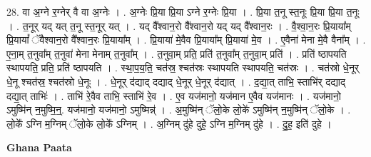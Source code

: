 \documentclass[17pt]{extarticle}
\begin{document}
28. वा अ॒ग्ने र॒ग्नेर् वै वा अ॒ग्नेः । . अ॒ग्नेः प्रि॒या प्रि॒या ऽग्ने र॒ग्नेः प्रि॒या । . प्रि॒या त॒नू स्त॒नूः प्रि॒या प्रि॒या त॒नूः । . त॒नूर् यद् यत् त॒नू स्त॒नूर् यत् । . यद् वै᳚श्वान॒रो वै᳚श्वान॒रो यद् यद् वै᳚श्वान॒रः । . वै॒श्वा॒न॒रः प्रि॒याया᳚म् प्रि॒यायां᳚ ॅवैश्वान॒रो वै᳚श्वान॒रः प्रि॒याया᳚म् । . प्रि॒याया॑ मे॒वैव प्रि॒याया᳚म् प्रि॒याया॑ मे॒व । . ए॒वैना॑ मेना मे॒वै वैना᳚म् । . ए॒ना॒म् त॒नुवा᳚म् त॒नुवा॑ मेना मेनाम् त॒नुवा᳚म् । . त॒नुवा॒म् प्रति॒ प्रति॑ त॒नुवा᳚म् त॒नुवा॒म् प्रति॑ । . प्रति॑ ष्ठापयति स्थापयति॒ प्रति॒ प्रति॑ ष्ठापयति । . स्था॒प॒य॒ति॒ चत॑स्र॒ श्चत॑स्रः स्थापयति स्थापयति॒ चत॑स्रः । . चत॑स्रो धे॒नूर् धे॒नू श्चत॑स्र॒ श्चत॑स्रो धे॒नूः । . धे॒नूर् द॑द्याद् दद्याद् धे॒नूर् धे॒नूर् द॑द्यात् । . द॒द्या॒त् ताभि॒ स्ताभि॑र् दद्याद् दद्या॒त् ताभिः॑ । . ताभि॑ रे॒वैव ताभि॒ स्ताभि॑ रे॒व । . ए॒व यज॑मानो॒ यज॑मान ए॒वैव यज॑मानः । . यज॑मानो॒ ऽमुष्मि॑न् न॒मुष्मि॒न्॒. यज॑मानो॒ यज॑मानो॒ ऽमुष्मिन्न्॑ । . अ॒मुष्मि॑न् ॅलो॒के लो॒के॑ ऽमुष्मि॑न् न॒मुष्मि॑न् ॅलो॒के । . लो॒के᳚ ऽग्नि म॒ग्निम् ॅलो॒के लो॒के᳚ ऽग्निम् । . अ॒ग्निम् दु॑हे दुहे॒ ऽग्नि म॒ग्निम् दु॑हे । . दु॒ह॒ इति॑ दुहे । \newline

\textbf{Ghana Paata } \newline
\end{document}

